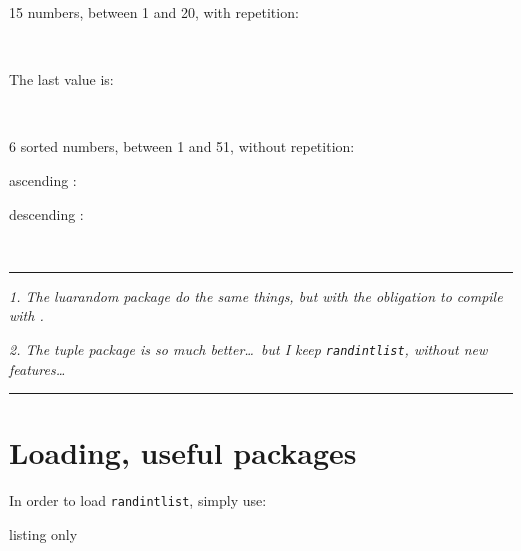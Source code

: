 \documentclass[11pt,a4paper]{ltxdoc}
\begin{document}
\begin{tcolorbox}[colframe=lightgray,colback=lightgray!5]
15 numbers, between 1 and 20, with repetition:

\hfill\randintlist[min=1,max=20,nb=15,repeat]{\mylist}\textcolor{red}{\mylist}\hfill~

The last value is:

\hfill\textcolor{blue}{}\hfill~
\end{tcolorbox}

\begin{tcolorbox}[colframe=lightgray,colback=lightgray!5]
6 sorted numbers, between 1 and 51, without repetition:

\hfill\randintlist[min=1,max=51,nb=6,sort=asc]{\mylist}ascending : \textcolor{red}{\mylist}\hfill~

\hfill\randintlist[min=1,max=51,nb=6,sort=des,sep=>]{\mylist}descending : \textcolor{red}{\mylist}\hfill~
\end{tcolorbox}

\vfill~

\hrule

\medskip

\emph{%
	1. The \textsf{luarandom} package do the same things, but with the obligation to compile with .
}

\emph{%
	2. The \textsf{tuple} package is so much better\ldots\ but I keep \texttt{randintlist}, without new features\ldots
}

\medskip

\hrule

\vspace*{5mm}

\pagebreak


\hypertarget{matoc}{}

\tableofcontents

\vspace*{5mm}


\pagebreak

\section{Loading, useful packages}

In order to load \texttt{randintlist}, simply use:

\begin{DemoCode}{listing only}
\usepackage{randintlist}
\end{DemoCode}
\end{document}
